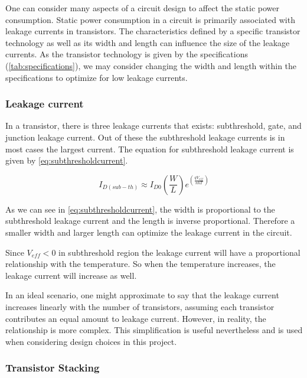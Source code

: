 One can consider many aspects of a circuit design to affect the static power consumption. Static power consumption in a circuit is primarily associated with leakage currents in transistors. The characteristics defined by a specific transistor technology as well as its width and length can influence the size of the leakage currents. As the transistor technology is given by the specifications (\ref{tab:specifications}), we may consider changing the width and length within the specifications to optimize for low leakage currents. 

\subsubsection{Leakage current}

In a transistor, there is three leakage currents that exists: subthreshold, gate, and
junction leakage current. Out of these the subthreshold leakage currents is in most cases the largest current. \cite{Analog_integrated} The equation for subthreshold leakage current is given by \autoref{eq:subthresholdcurrent}. 

\begin{equation}
    \label{eq:subthresholdcurrent}
    I_{D(sub-th)} \approx I_{D0}\left(\frac{W}{L}\right)e^{\left(\frac{qV_{eff}}{nkT}\right)}
\end{equation}

As we can see in \autoref{eq:subthresholdcurrent}, the width is proportional to the subthreshold leakage current and the length is inverse proportional. Therefore a smaller width and larger length can optimize the leakage current in the circuit.

Since $V_{eff} < 0$ in subthreshold region the leakage current will have a proportional relationship with the temperature. So when the temperature increases, the leakage current will increase as well. 

In an ideal scenario, one might approximate to say that the leakage current increases linearly with the number of transistors, assuming each transistor contributes an equal amount to leakage current. However, in reality, the relationship is more complex. This simplification is useful nevertheless and is used when considering design choices in this project.

\subsubsection{Transistor Stacking}



